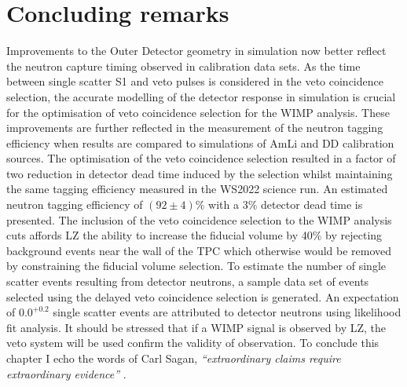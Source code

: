 \section{Concluding remarks}
Improvements to the Outer Detector geometry in simulation now better reflect the neutron capture timing observed in calibration data sets. As the time between single scatter S1 and veto pulses is considered in the veto coincidence selection, the accurate modelling of the detector response in simulation is crucial for the optimisation of veto coincidence selection for the WIMP analysis. These improvements are further reflected in the measurement of the neutron tagging efficiency when results are compared to simulations of AmLi and DD calibration sources. The optimisation of the veto coincidence selection resulted in a factor of two reduction in detector dead time induced by the selection whilst maintaining the same tagging efficiency measured in the WS2022 science run. An estimated neutron tagging efficiency of $(92\pm4)\%$ with a 3\% detector dead time is presented. The inclusion of the veto coincidence selection to the WIMP analysis cuts affords LZ the ability to increase the fiducial volume by 40\% by rejecting background events near the wall of the TPC which otherwise would be removed by constraining the fiducial volume selection. To estimate the number of single scatter events resulting from detector neutrons, a sample data set of events selected using the delayed veto coincidence selection is generated. An expectation of $0.0^{+0.2}$ single scatter events are attributed to detector neutrons using likelihood fit analysis. It should be stressed that if a WIMP signal is observed by LZ, the veto system will be used confirm the validity of observation. To conclude this chapter I echo the words of Carl Sagan, \textit{``extraordinary claims require extraordinary evidence''} \cite{SaganCarl:BrocasBrain}.